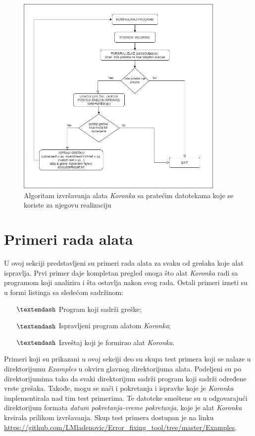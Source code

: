 \documentclass[12pt,oneside]{memoir}
\theoremstyle{plain}
\theoremstyle{definition}
\begin{document}
\begin{figure}[!ht]
  \centering
  \includegraphics[width=0.9\textwidth]{Dijagram.png}
  \caption{Algoritam izvršavanja alata \textit{Koronka} sa pratećim datotekama koje se koriste za njegovu realizaciju}
  \label{fig:slika4.4}
\end{figure}

\section{Primeri rada alata}
U ovoj sekciji predstavljeni su primeri rada alata za svaku od grešaka koje alat ispravlja. Prvi primer daje kompletan pregled onoga što alat \textit{Koronka} radi sa programom koji analizira i šta ostavlja nakon svog rada. Ostali primeri izneti su u formi listinga sa sledećom sadržinom:
\begin{itemize}
\item[$\textendash$] Program koji sadrži greške;
\item[$\textendash$] Ispravljeni program alatom \textit{Koronka};
\item[$\textendash$] Izveštaj koji je formirao alat \textit{Koronka}.
\end{itemize} 

Primeri koji su prikazani u ovoj sekciji deo su skupa test primera koji se nalaze u direktorijumu \textit{Examples} u okviru glavnog direktorijuma alata. Podeljeni su po direktorijumima tako da svaki direktorijum sadrži program koji sadrži određene vrste grešaka. Takođe, mogu se naći i pokretanja i ispravke koje je \textit{Koronka} implementirala nad tim test primerima. Te datoteke smeštene su u odgovarajući direktorijum formata \textit{datum pokretanja-vreme pokretanja}, koje je alat \textit{Koronka} kreirala prilikom izvršavanja. Skup test primera dostupan je na linku \url{https://github.com/LMladenovic/Error_fixing_tool/tree/master/Examples}.  
\end{document}
